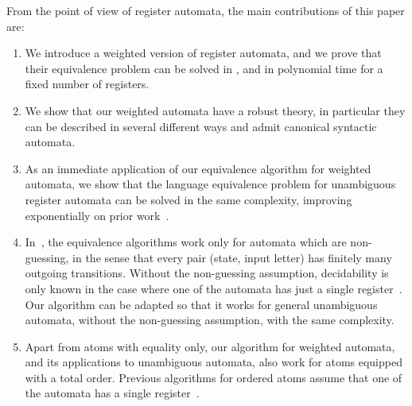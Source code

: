 \documentclass{theoretics}
\newcommand{\exptime}{{\sc{ExpTime}}\xspace }
\begin{document}
From the point of view of register automata, the main contributions of this paper are:
\begin{enumerate}
    \item We introduce a weighted version of register automata, and we prove that their equivalence problem can be solved in \exptime, and in polynomial time for a fixed number of registers.
    \item We show that our weighted automata have a robust theory, in particular they can be described in several different ways and admit canonical syntactic automata. 
    \item As an immediate application of our equivalence algorithm for weighted automata, we show that the language equivalence problem for unambiguous register automata can be solved in the same complexity, improving  exponentially on prior work~\cite{clementeUnamb2021, MottetQ19}.
    \item In~\cite{clementeUnamb2021, MottetQ19}, the  equivalence algorithms  work only  for automata which are non-guessing, in the sense that every pair (state, input letter) has finitely many outgoing transitions. Without the non-guessing assumption, decidability is only known in the case where one of the automata has just a single register~\cite[Thm.~10]{MottetQ19Guessing}. Our algorithm can be adapted so that it works for general unambiguous automata, without the non-guessing assumption, with the same complexity.
    \item Apart from atoms with equality only, our algorithm for weighted automata, and its applications to unambiguous automata, also work for atoms equipped with a total order. Previous algorithms for ordered atoms assume that  one of the automata has a single register~\cite[Thm.~2]{MottetQ19}.
\end{enumerate}
\end{document}
